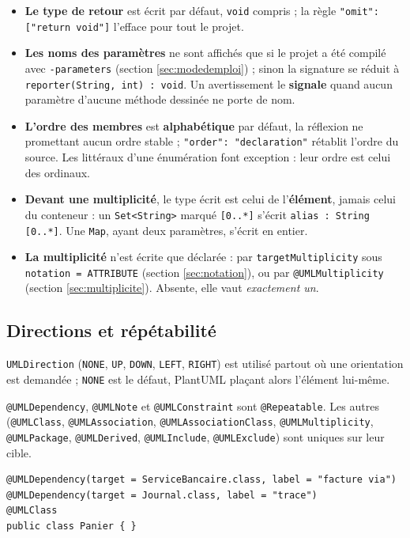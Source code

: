 \documentclass[12pt, a4paper]{article}
\begin{document}
\begin{itemize}
    \item \textbf{Le type de retour} est écrit par défaut, \texttt{void} compris ; la règle \texttt{"omit": ["return void"]} l'efface pour tout le projet.
    \item \textbf{Les noms des paramètres} ne sont affichés que si le projet a été compilé avec \texttt{-parameters} (section \ref{sec:modedemploi}) ; sinon la signature se réduit à \texttt{reporter(String, int) : void}. Un avertissement le \textbf{signale} quand aucun paramètre d'aucune méthode dessinée ne porte de nom.
    \item \textbf{L'ordre des membres} est \textbf{alphabétique} par défaut, la réflexion ne promettant aucun ordre stable ; \texttt{"order": "declaration"} rétablit l'ordre du source. Les littéraux d'une énumération font exception : leur ordre est celui des ordinaux.
    \item \textbf{Devant une multiplicité}, le type écrit est celui de l'\textbf{élément}, jamais celui du conteneur : un \texttt{Set<String>} marqué \texttt{[0..*]} s'écrit \texttt{alias : String [0..*]}. Une \texttt{Map}, ayant deux paramètres, s'écrit en entier.
    \item \textbf{La multiplicité} n'est écrite que déclarée : par \texttt{targetMultiplicity} sous \texttt{notation = ATTRIBUTE} (section \ref{sec:notation}), ou par \texttt{@UMLMultiplicity} (section \ref{sec:multiplicite}). Absente, elle vaut \textit{exactement un}.
\end{itemize}

\subsection{Directions et répétabilité}
\texttt{UMLDirection} (\texttt{NONE}, \texttt{UP}, \texttt{DOWN}, \texttt{LEFT}, \texttt{RIGHT}) est utilisé partout où une orientation est demandée ; \texttt{NONE} est le défaut, PlantUML plaçant alors l'élément lui-même.

\texttt{@UMLDependency}, \texttt{@UMLNote} et \texttt{@UMLConstraint} sont \texttt{@Repeatable}. Les autres (\texttt{@UMLClass}, \texttt{@UMLAssociation}, \texttt{@UMLAssociationClass}, \texttt{@UMLMultiplicity}, \texttt{@UMLPackage}, \texttt{@UMLDerived}, \texttt{@UMLInclude}, \texttt{@UMLExclude}) sont uniques sur leur cible.

\begin{lstlisting}
@UMLDependency(target = ServiceBancaire.class, label = "facture via")
@UMLDependency(target = Journal.class, label = "trace")
@UMLClass
public class Panier { }
\end{lstlisting}
\end{document}

